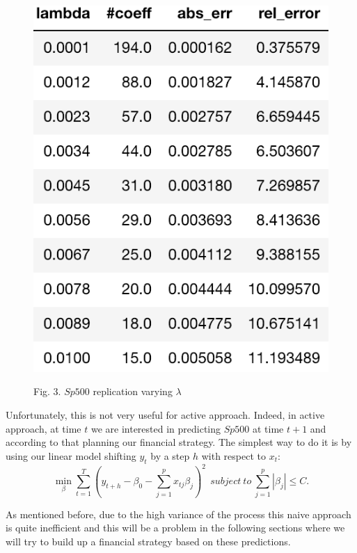 \documentclass{article}%
\begin{document}
\begin{figure}[h!]
  \centering
  \includegraphics[scale=0.6]{err_lambda.png}
    
\begin{center}
\begin{small}
Fig. 3. $Sp500$ replication varying $\lambda$
\end{small}
\end{center}

  \label{err_alpha}
\end{figure}

Unfortunately, this is not very useful for active approach. Indeed, in active approach, at time $t$ we are interested in predicting $Sp500$ at time $t+1$ and according to that planning our financial strategy. The simplest way to do it is by using our linear model shifting $y_t$ by a step $h$ with respect to $x_t$:
\begin{equation}
 \min_{\beta} \sum_{t=1}^T ( y_{t+h} -\beta_0 -\sum_{j=1}^p x_{tj} \beta_j)^2 ~~subject~to~\sum_{j=1}^p |\beta_j| \leq C.
\end{equation}

As mentioned before, due to the high variance of the process this naive approach is quite inefficient and this will be a problem in the following sections where we will try to build up a financial strategy based on these predictions.
\end{document}
